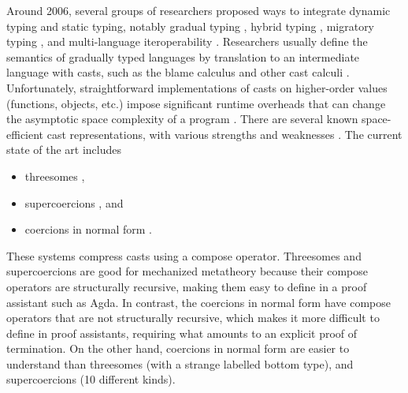 \documentclass[acmsmall,review,anonymous]{acmart}\settopmatter{printfolios=true,printccs=false,printacmref=false}
\begin{document}
Around 2006, several groups of researchers proposed ways to integrate
dynamic typing and static typing, notably gradual typing
\citep{siek2006gradual}, hybrid typing \citep{flanagan2006hybrid},
migratory typing \citep{Tobin-Hochstadt:2006fk}, and multi-language
iteroperability \citep{Gray:2005ij,Matthews:2007zr}. Researchers
usually define the semantics of gradually typed languages by
translation to an intermediate language with casts, such as the blame
calculus \citep{wadler2009well} and other cast calculi
\citep{siek2009exploring}. Unfortunately, straightforward
implementations of casts on higher-order values (functions, objects,
etc.) impose significant runtime overheads that can change the
asymptotic space complexity of a program
\citep{herman2010space}. There are several known space-efficient cast
representations, with various strengths and weaknesses
\citep{siek2015blame,siek2010threesomes,garcia2013calculating,kuhlenschmidt2018efficient,siek2012interpretations,garcia2014deriving}.
The current state of the art includes

\begin{itemize}
\item threesomes \citep{siek2010threesomes,garcia2013calculating},
\item supercoercions \citep{garcia2013calculating}, and
\item coercions in normal form
  \citep{siek2012interpretations,siek2015blame}.
\end{itemize}
These systems compress casts using a compose operator.
Threesomes and supercoercions are good for mechanized
metatheory because their compose operators are structurally recursive,
making them easy to define in a proof assistant such as Agda. In
contrast, the coercions in normal form have compose operators that are
not structurally recursive, which makes it more difficult to define in
proof assistants, requiring what amounts to an explicit proof of termination.
%
On the other hand, coercions in normal form are easier to understand
than threesomes (with a strange labelled bottom type), and
supercoercions (10 different kinds).
\end{document}
